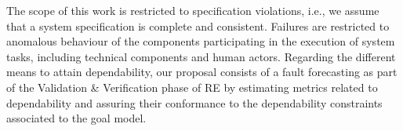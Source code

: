 
The scope of this work is restricted to specification violations, i.e., we assume that a system specification is complete and consistent. Failures are restricted to anomalous behaviour of the components participating in the execution of system tasks, including technical components and human actors. Regarding the different means to attain dependability, our proposal consists of a fault forecasting as part of the Validation \& Verification phase of RE by estimating metrics related to dependability and assuring their conformance to the dependability constraints associated to the goal model. 

%
%
%
%
%
%
%
%
%
%
